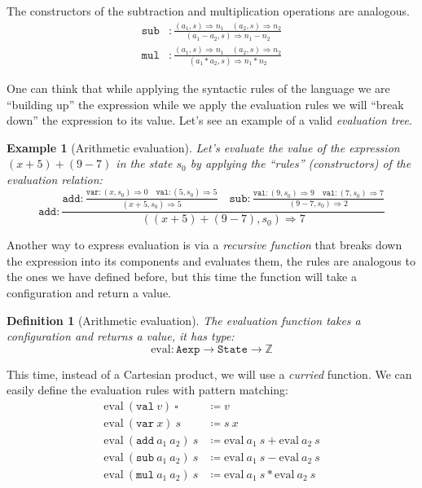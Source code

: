 \documentclass[
  a4paper, 
  10pt, 
  parskip=half, 
  DIV=20,
  toc=bibliography,
  usegeometry,
]{scrartcl}
\newtheorem{definition}[theorem]{Definition}
\newtheorem{example}[theorem]{Example}
\newcommand{\funfont}[1]{\text{#1}}
\newcommand{\tyfont}[1]{\texttt{#1}}
\newcommand{\bigstep}{\Longrightarrow}
\begin{document}
The constructors of the subtraction and multiplication operations are analogous.
\begin{align*}
  \texttt{sub} &: \frac{(a_1, s) \bigstep n_1 \quad (a_2, s) \bigstep n_2}
   {(a_1 - a_2, s) \bigstep n_1 - n_2} \\
  \texttt{mul} &: \frac{(a_1, s) \bigstep n_1 \quad (a_2, s) \bigstep n_2}
   {(a_1 * a_2, s) \bigstep n_1 * n_2}
\end{align*}

One can think that while applying the syntactic rules of the language we are
\enquote{building up} the expression while we apply the evaluation rules
we will \enquote{break down} the expression to its value.
Let's see an example of a valid \emph{evaluation tree}.

\begin{example}[Arithmetic evaluation]\label{ex:arithmetic_evaluation}
  Let's evaluate the value of the expression
  \((x + 5) + (9 - 7)\) in the state \(s_0\) by applying the \enquote{rules} 
  (constructors) of the evaluation relation:
\[
  \texttt{add}: \frac{
    \texttt{add}: \displaystyle{\frac{
      \texttt{var}: (x, s_0) \bigstep 0
      \quad
      \texttt{val}: (5, s_0) \bigstep 5
    }{(x + 5, s_0) \bigstep 5}}
    \quad 
    \texttt{sub}: \displaystyle{\frac{
      \texttt{val}: (9, s_0) \bigstep 9
      \quad
      \texttt{val}: (7, s_0) \bigstep 7
    }{(9 - 7, s_0) \bigstep 2}}
  }
  {((x + 5) + (9 - 7), s_0) \bigstep 7}
\]
\end{example}

Another way to express evaluation is via a \emph{recursive function} that breaks
down the expression into its components and evaluates them, the rules are
analogous to the ones we have defined before, but this time the function will
take a configuration and return a value.

\begin{definition}[Arithmetic evaluation]
  The evaluation function takes a configuration and returns a value, it has type:
  \[
  \funfont{eval} : \tyfont{Aexp} \to \tyfont{State} \to \mathbb{Z}
  \]
\end{definition}

This time, instead of a Cartesian product, we will use a \emph{curried} function.
We can easily define the evaluation rules with pattern matching:
\begin{align*}
  \funfont{eval} \ (\texttt{val} \ v) \ \square &\coloneqq v \\
  \funfont{eval} \ (\texttt{var} \ x) \ s &\coloneqq s \ x \\
  \funfont{eval} \ (\texttt{add} \ a_1 \ a_2) \ s &\coloneqq \funfont{eval} \ a_1 \ s + \funfont{eval} \ a_2 \ s \\
  \funfont{eval} \ (\texttt{sub} \ a_1 \ a_2) \ s &\coloneqq \funfont{eval} \ a_1 \ s - \funfont{eval} \ a_2 \ s \\
  \funfont{eval} \ (\texttt{mul} \ a_1 \ a_2) \ s &\coloneqq \funfont{eval} \ a_1 \ s * \funfont{eval} \ a_2 \ s
\end{align*}
\end{document}
